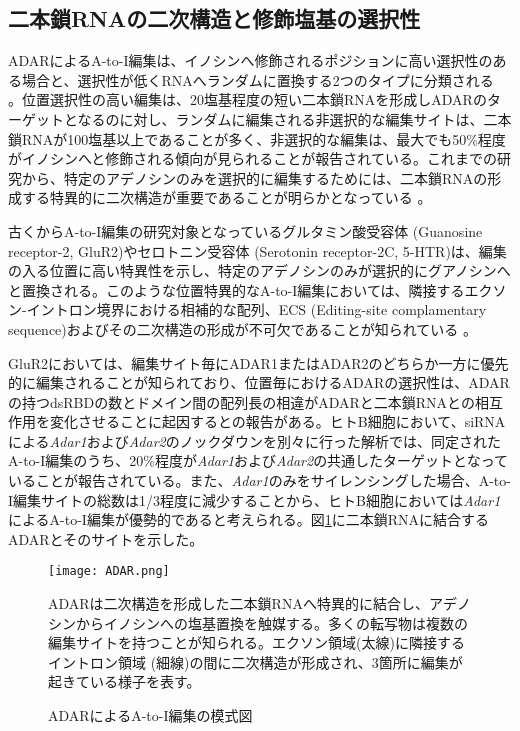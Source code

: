 \subsection{二本鎖RNAの二次構造と修飾塩基の選択性}
ADARによるA-to-I編集は、イノシンへ修飾されるポジションに高い選択性のある場合と、選択性が低くRNAへランダムに置換する2つのタイプに分類される \citep{Nis10}。位置選択性の高い編集は、20塩基程度の短い二本鎖RNAを形成しADARのターゲットとなるのに対し、ランダムに編集される非選択的な編集サイトは、二本鎖RNAが100塩基以上であることが多く、非選択的な編集は、最大でも50\%程度がイノシンへと修飾される傾向が見られることが報告されている。これまでの研究から、特定のアデノシンのみを選択的に編集するためには、二本鎖RNAの形成する特異的に二次構造が重要であることが明らかとなっている \citep{LehBas9908}。
\par
古くからA-to-I編集の研究対象となっているグルタミン酸受容体 (Guanosine receptor-2, GluR2)やセロトニン受容体 (Serotonin receptor-2C, 5-HTR)は、編集の入る位置に高い特異性を示し、特定のアデノシンのみが選択的にグアノシンへと置換される。このような位置特異的なA-to-I編集においては、隣接するエクソン-イントロン境界における相補的な配列、ECS (Editing-site complamentary sequence)およびその二次構造の形成が不可欠であることが知られている \citep{HigSinKoh9312}。
\par
GluR2においては、編集サイト毎にADAR1またはADAR2のどちらか一方に優先的に編集されることが知られており、位置毎におけるADARの選択性は、ADARの持つdsRBDの数とドメイン間の配列長の相違がADARと二本鎖RNAとの相互作用を変化させることに起因するとの報告がある。ヒトB細胞において、siRNAによる\textit{Adar1}および\textit{Adar2}のノックダウンを別々に行った解析では、同定されたA-to-I編集のうち、20\%程度が\textit{Adar1}および\textit{Adar2}の共通したターゲットとなっていることが報告されている。また、\textit{Adar1}のみをサイレンシングした場合、A-to-I編集サイトの総数は1/3程度に減少することから、ヒトB細胞においては\textit{Adar1}によるA-to-I編集が優勢的であると考えられる。図\ref{fig:ADAR}に二本鎖RNAに結合するADARとそのサイトを示した。
\begin{figure}[!h]
	\begin{center}
		\texttt{[image: ADAR.png]}
	\end{center}
	\caption{ADARによるA-to-I編集の模式図}
	\begin{flushleft}
		\small{ADARは二次構造を形成した二本鎖RNAへ特異的に結合し、アデノシンからイノシンへの塩基置換を触媒する。多くの転写物は複数の編集サイトを持つことが知られる。エクソン領域(太線)に隣接するイントロン領域 (細線)の間に二次構造が形成され、3箇所に編集が起きている様子を表す。}
	\end{flushleft}
	\label{fig:ADAR}
\end{figure}

